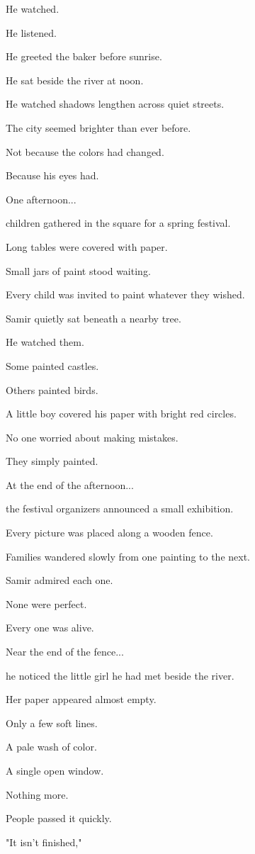 \documentclass[12pt,openany]{book}
\begin{document}
He watched.

He listened.

He greeted the baker before sunrise.

He sat beside the river at noon.

He watched shadows lengthen across quiet streets.

The city seemed brighter than ever before.

Not because the colors had changed.

Because his eyes had.

One afternoon...

children gathered in the square for a spring festival.

Long tables were covered with paper.

Small jars of paint stood waiting.

Every child was invited to paint whatever they wished.

Samir quietly sat beneath a nearby tree.

He watched them.

Some painted castles.

Others painted birds.

A little boy covered his paper with bright red circles.

No one worried about making mistakes.

They simply painted.

At the end of the afternoon...

the festival organizers announced a small exhibition.

Every picture was placed along a wooden fence.

Families wandered slowly from one painting to the next.

Samir admired each one.

None were perfect.

Every one was alive.

Near the end of the fence...

he noticed the little girl he had met beside the river.

Her paper appeared almost empty.

Only a few soft lines.

A pale wash of color.

A single open window.

Nothing more.

People passed it quickly.

"It isn't finished,"
\end{document}
